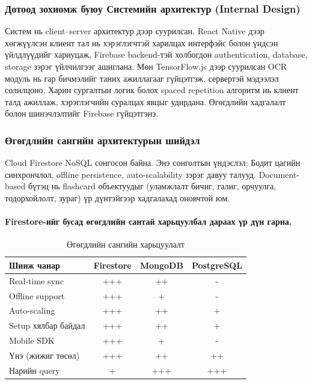 \subsubsection{Дотоод зохиомж буюу Системийн архитектур (Internal Design)}

Систем нь client–server архитектур дээр суурилсан. React Native дээр хөгжүүлсэн клиент тал нь хэрэглэгчтэй харилцах интерфэйс болон үндсэн үйлдлүүдийг хариуцаж, Firebase backend-тэй холбогдон authentication, database, storage зэрэг үйлчилгээг ашиглана. Мөн TensorFlow.js дээр суурилсан OCR модуль нь гар бичмэлийг таних ажиллагааг гүйцэтгэж, сервертэй мэдээлэл солилцоно. Харин сургалтын логик болох spaced repetition алгоритм нь клиент талд ажиллаж, хэрэглэгчийн суралцах явцыг удирдана. Өгөгдлийн хадгалалт болон шинэчлэлтийг Firebase гүйцэтгэнэ.
\subsubsection{Өгөгдлийн сангийн архитектурын шийдэл}

Cloud Firestore NoSQL сонгосон байна. Энэ сонголтын үндэслэл: Бодит цагийн синхрончлол, offline persistence, auto-scalability зэрэг давуу талууд. Document-based бүтэц нь flashcard объектуудыг (уламжлалт бичиг, галиг, орчуулга, тодорхойлолт, зураг) үр дүнтэйгээр хадгалахад оновчтой юм.

\paragraph{Firestore-ийг бусад өгөгдлийн сантай харьцуулбал дараах үр дүн гарна.}

\begin{table}[H]
\centering
\caption{Өгөгдлийн сангийн харьцуулалт}
\label{tab:database-comparison}
\begin{tabular}{|l|c|c|c|}
\hline
\textbf{Шинж чанар} & \textbf{Firestore} & \textbf{MongoDB} & \textbf{PostgreSQL} \\
\hline
Real-time sync & +++ & ++ & - \\
\hline
Offline support & +++ & + & - \\
\hline
Auto-scaling & +++ & ++ & + \\
\hline
Setup хялбар байдал & +++ & ++ & + \\
\hline
Mobile SDK & +++ & + & - \\
\hline
Үнэ (жижиг төсөл) & +++ & ++ & ++ \\
\hline
Нарийн query & + & +++ & +++ \\
\hline
\end{tabular}
\end{table}

